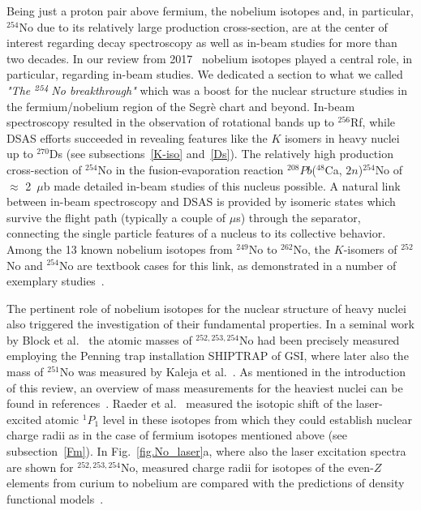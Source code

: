 Being just a proton pair above fermium, the nobelium isotopes and, in particular, $^{254}$No due to its relatively large production cross-section, are at the center of interest regarding decay spectroscopy as well as in-beam studies for more than two decades.  
In our review from 2017~\cite{Ackermann2017} nobelium isotopes played a central role, in particular, regarding in-beam studies. 
We dedicated a section to what we called {\it "The $^{\it 254}$No breakthrough"} which was a boost for the nuclear structure studies in the fermium/nobelium region of the Segr\`{e} chart and beyond.
In-beam spectroscopy resulted in the observation of rotational bands up to $^{256}$Rf, while DSAS efforts succeeded in revealing features like the $K$ isomers in heavy nuclei up to $^{270}$Ds (see subsections~\ref{K-iso} and~\ref{Ds}).
The relatively high production cross-section of $^{254}$No in the fusion-evaporation reaction $^{208} Pb$($^{48}$Ca, $2n$)$^{254}$No of $\approx$ 2~$\mu$b made detailed in-beam studies of this nucleus possible. 
A natural link between in-beam spectroscopy and DSAS is provided by isomeric states which survive the flight path (typically a couple of $\mu$s) through the separator, connecting the single particle features of a nucleus to its collective behavior. 
Among the 13 known nobelium isotopes from $^{249}$No to $^{262}$No, the $K$-isomers of $^{252}$No and $^{254}$No are textbook cases for this link, as demonstrated in a number of exemplary studies~\cite{Sulignano2007,Sulignano2012,Tandel2006,Clark2010,Hessberger2010}. 

The pertinent role of nobelium isotopes for the nuclear structure of heavy nuclei also triggered the investigation of their fundamental properties.
In a seminal work by Block et al.~\cite{Block2010} the atomic masses of $^{252,253,254}$No had been precisely measured employing the Penning trap installation SHIPTRAP of GSI, where later also the mass of $^{251}$No was measured by Kaleja et al.~\cite{Kaleja2022}. 
As mentioned in the introduction of this review, an overview of mass measurements for the heaviest nuclei can be found in references~\cite{Block2019,Block2019a}. 
Raeder et al.~\cite{Raeder2018} measured the isotopic shift of the laser-excited atomic $^1P_1$ level in these isotopes from which they could establish nuclear charge radii as in the case of fermium isotopes mentioned above (see subsection~\ref{Fm}). 
In Fig.~\ref{fig.No_laser}a, where also the laser excitation spectra are shown for $^{252,253,254}$No, measured charge radii for isotopes of the even-$Z$ elements from curium to nobelium are compared with the predictions of density functional models~\cite{Kluepfel2009,Kortelainen2012}.
 \\

